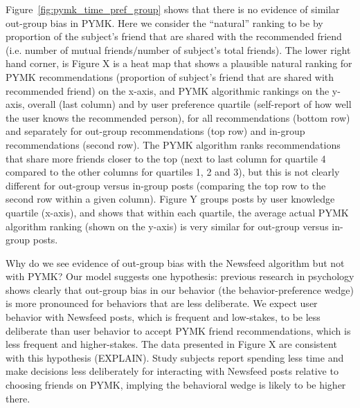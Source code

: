 \documentclass[12pt,letterpaper]{article}
\begin{document}
Figure~\ref{fig:pymk_time_pref_group} shows that there is no evidence of similar out-group bias in PYMK. Here we consider the ``natural'' ranking to be by proportion of the subject's friend that are shared with the recommended friend (i.e. number of mutual friends$/$number of subject's total friends). The lower right hand corner, is  Figure X is a heat map that shows a plausible natural ranking for PYMK recommendations (proportion of subject's friend that are shared with recommended friend) on the x-axis, and PYMK algorithmic rankings on the y-axis, overall (last column) and by user preference quartile (self-report of how well the user knows the recommended person), for all recommendations (bottom row) and separately for out-group recommendations (top row) and in-group recommendations (second row). The PYMK algorithm ranks recommendations that share more friends closer to the top (next to last column for quartile 4 compared to the other columns for quartiles 1, 2 and 3), but this is not clearly different for out-group versus in-group posts (comparing the top row to the second row within a given column). Figure Y groups posts by user knowledge quartile (x-axis), and shows that within each quartile, the average actual PYMK algorithm ranking (shown on the y-axis) is very similar for out-group versus in-group posts.

Why do we see evidence of out-group bias with the Newsfeed algorithm but not with PYMK? Our model suggests one hypothesis: previous research in psychology shows clearly that out-group bias in our behavior (the behavior-preference wedge) is more pronounced for behaviors that are less deliberate. We expect user behavior with Newsfeed posts, which is frequent and low-stakes, to be less deliberate than user behavior to accept PYMK friend recommendations, which is less frequent and higher-stakes. The data presented in Figure X are consistent with this hypothesis (EXPLAIN). Study subjects report spending less time and make decisions less deliberately for interacting with Newsfeed posts relative to choosing friends on PYMK, implying the behavioral wedge is likely to be higher there.
\end{document}

